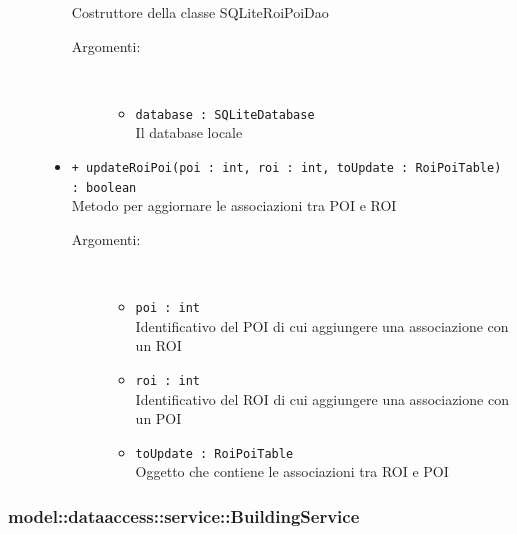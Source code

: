 \documentclass[../DefinizioneDiProdotto.tex]{subfiles}
\begin{document}
\begin{description}
\begin{itemize}
Costruttore della classe SQLiteRoiPoiDao
 \begin{description}
\item[Argomenti:] \
\begin{itemize}
\item \texttt{database : SQLiteDatabase}\\
Il database locale\end{itemize}
\end{description}
\item \texttt{+ updateRoiPoi(poi : int, roi : int, toUpdate : RoiPoiTable) : boolean}\\
Metodo per aggiornare le associazioni tra POI e ROI
 \begin{description}
\item[Argomenti:] \
\begin{itemize}
\item \texttt{poi : int}\\
Identificativo del POI di cui aggiungere una associazione con un ROI\item \texttt{roi : int}\\
Identificativo del ROI di cui aggiungere una associazione con un POI\item \texttt{toUpdate : RoiPoiTable}\\
Oggetto che contiene le associazioni tra ROI e POI\end{itemize}
\end{description}
\end{itemize}
\end{description}

\subsubsection{model::dataaccess::service::BuildingService}
\end{document}
